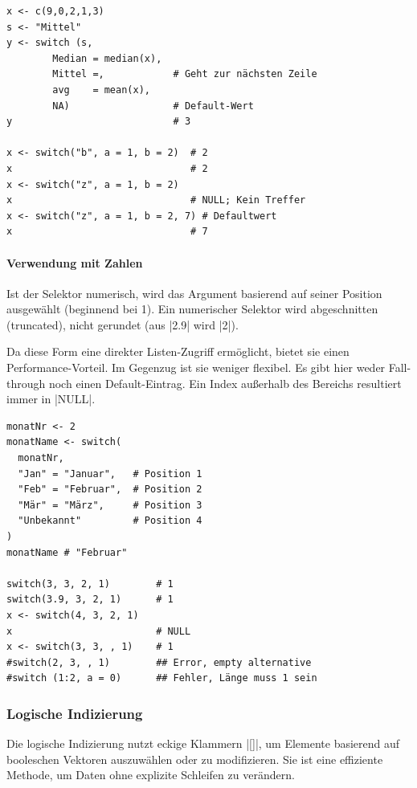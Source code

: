\documentclass[10pt,twocolumn]{scrartcl}
\renewcommand{\lstinline}{\mycoloredinline}
\begin{document}
\begin{lstlisting}
x <- c(9,0,2,1,3)
s <- "Mittel"
y <- switch (s,
        Median = median(x),
        Mittel =,            # Geht zur nächsten Zeile
        avg    = mean(x),
        NA)                  # Default-Wert
y                            # 3

x <- switch("b", a = 1, b = 2)  # 2
x                               # 2
x <- switch("z", a = 1, b = 2)
x                               # NULL; Kein Treffer
x <- switch("z", a = 1, b = 2, 7) # Defaultwert
x                               # 7
\end{lstlisting}

\paragraph{Verwendung mit Zahlen}

Ist der Selektor numerisch, wird das Argument basierend auf seiner Position ausgewählt (beginnend bei 1). Ein numerischer Selektor wird abgeschnitten (truncated), nicht gerundet (aus \lstinline|2.9| wird \lstinline|2|).

Da diese Form eine direkter Listen-Zugriff ermöglicht, bietet sie einen Performance-Vorteil. Im Gegenzug ist sie weniger flexibel. Es gibt hier weder Fall-through noch einen Default-Eintrag. Ein Index außerhalb des Bereichs resultiert immer in \lstinline|NULL|.

\begin{lstlisting}
monatNr <- 2
monatName <- switch(
  monatNr,
  "Jan" = "Januar",   # Position 1
  "Feb" = "Februar",  # Position 2
  "Mär" = "März",     # Position 3
  "Unbekannt"         # Position 4
)
monatName # "Februar"

switch(3, 3, 2, 1)        # 1
switch(3.9, 3, 2, 1)      # 1
x <- switch(4, 3, 2, 1)
x                         # NULL
x <- switch(3, 3, , 1)    # 1
#switch(2, 3, , 1)        ## Error, empty alternative
#switch (1:2, a = 0)      ## Fehler, Länge muss 1 sein
\end{lstlisting}


\subsubsection{Logische Indizierung}

Die logische Indizierung nutzt eckige Klammern \lstinline|[]|, um Elemente basierend auf booleschen Vektoren auszuwählen oder zu modifizieren. Sie ist eine effiziente Methode, um Daten ohne explizite Schleifen zu verändern.
\end{document}

